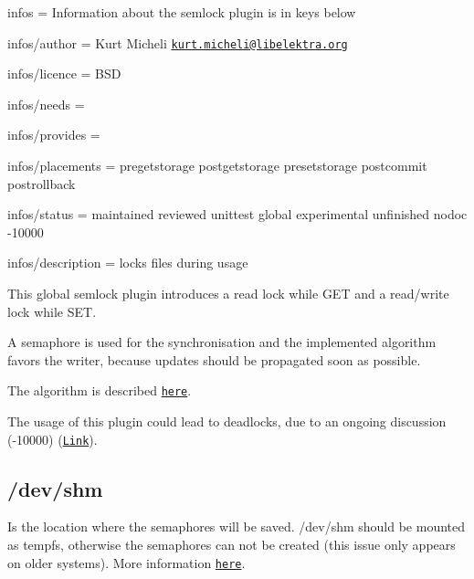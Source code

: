 
\begin{DoxyItemize}
\item infos = Information about the semlock plugin is in keys below
\item infos/author = Kurt Micheli \href{mailto:kurt.micheli@libelektra.org}{\tt kurt.\+micheli@libelektra.\+org}
\item infos/licence = B\+S\+D
\item infos/needs =
\item infos/provides =
\item infos/placements = pregetstorage postgetstorage presetstorage postcommit postrollback
\item infos/status = maintained reviewed unittest global experimental unfinished nodoc -\/10000
\item infos/description = locks files during usage
\end{DoxyItemize}

This global semlock plugin introduces a read lock while {\ttfamily G\+E\+T} and a read/write lock while {\ttfamily S\+E\+T}.

A semaphore is used for the synchronisation and the implemented algorithm favors the writer, because updates should be propagated soon as possible.

The algorithm is described \href{https://en.wikipedia.org/wiki/Readers%E2%80%93writers_problem#Second_readers-writers_problem}{\tt here}.

The usage of this plugin could lead to deadlocks, due to an ongoing discussion (-\/10000) (\href{https://github.com/ElektraInitiative/libelektra/pull/555}{\tt Link}).

\subsection*{/dev/shm}

Is the location where the semaphores will be saved. {\ttfamily /dev/shm} should be mounted as tempfs, otherwise the semaphores can not be created (this issue only appears on older systems). More information \href{http://stackoverflow.com/questions/270113/how-do-i-stop-sem-open-failing-with-enosys}{\tt here}. 